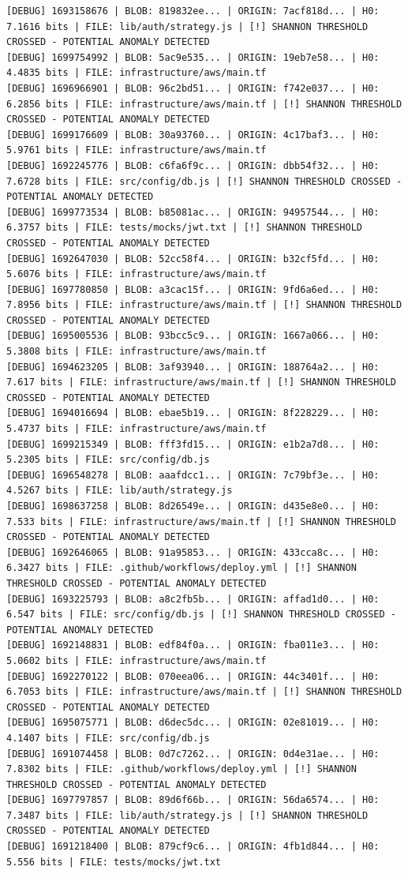 \documentclass[12pt, a4paper, oneside]{report}
\begin{document}
\begin{lstlisting}[basicstyle=\tiny\ttfamily]
[DEBUG] 1693158676 | BLOB: 819832ee... | ORIGIN: 7acf818d... | H0: 7.1616 bits | FILE: lib/auth/strategy.js | [!] SHANNON THRESHOLD CROSSED - POTENTIAL ANOMALY DETECTED
[DEBUG] 1699754992 | BLOB: 5ac9e535... | ORIGIN: 19eb7e58... | H0: 4.4835 bits | FILE: infrastructure/aws/main.tf
[DEBUG] 1696966901 | BLOB: 96c2bd51... | ORIGIN: f742e037... | H0: 6.2856 bits | FILE: infrastructure/aws/main.tf | [!] SHANNON THRESHOLD CROSSED - POTENTIAL ANOMALY DETECTED
[DEBUG] 1699176609 | BLOB: 30a93760... | ORIGIN: 4c17baf3... | H0: 5.9761 bits | FILE: infrastructure/aws/main.tf
[DEBUG] 1692245776 | BLOB: c6fa6f9c... | ORIGIN: dbb54f32... | H0: 7.6728 bits | FILE: src/config/db.js | [!] SHANNON THRESHOLD CROSSED - POTENTIAL ANOMALY DETECTED
[DEBUG] 1699773534 | BLOB: b85081ac... | ORIGIN: 94957544... | H0: 6.3757 bits | FILE: tests/mocks/jwt.txt | [!] SHANNON THRESHOLD CROSSED - POTENTIAL ANOMALY DETECTED
[DEBUG] 1692647030 | BLOB: 52cc58f4... | ORIGIN: b32cf5fd... | H0: 5.6076 bits | FILE: infrastructure/aws/main.tf
[DEBUG] 1697780850 | BLOB: a3cac15f... | ORIGIN: 9fd6a6ed... | H0: 7.8956 bits | FILE: infrastructure/aws/main.tf | [!] SHANNON THRESHOLD CROSSED - POTENTIAL ANOMALY DETECTED
[DEBUG] 1695005536 | BLOB: 93bcc5c9... | ORIGIN: 1667a066... | H0: 5.3808 bits | FILE: infrastructure/aws/main.tf
[DEBUG] 1694623205 | BLOB: 3af93940... | ORIGIN: 188764a2... | H0: 7.617 bits | FILE: infrastructure/aws/main.tf | [!] SHANNON THRESHOLD CROSSED - POTENTIAL ANOMALY DETECTED
[DEBUG] 1694016694 | BLOB: ebae5b19... | ORIGIN: 8f228229... | H0: 5.4737 bits | FILE: infrastructure/aws/main.tf
[DEBUG] 1699215349 | BLOB: fff3fd15... | ORIGIN: e1b2a7d8... | H0: 5.2305 bits | FILE: src/config/db.js
[DEBUG] 1696548278 | BLOB: aaafdcc1... | ORIGIN: 7c79bf3e... | H0: 4.5267 bits | FILE: lib/auth/strategy.js
[DEBUG] 1698637258 | BLOB: 8d26549e... | ORIGIN: d435e8e0... | H0: 7.533 bits | FILE: infrastructure/aws/main.tf | [!] SHANNON THRESHOLD CROSSED - POTENTIAL ANOMALY DETECTED
[DEBUG] 1692646065 | BLOB: 91a95853... | ORIGIN: 433cca8c... | H0: 6.3427 bits | FILE: .github/workflows/deploy.yml | [!] SHANNON THRESHOLD CROSSED - POTENTIAL ANOMALY DETECTED
[DEBUG] 1693225793 | BLOB: a8c2fb5b... | ORIGIN: affad1d0... | H0: 6.547 bits | FILE: src/config/db.js | [!] SHANNON THRESHOLD CROSSED - POTENTIAL ANOMALY DETECTED
[DEBUG] 1692148831 | BLOB: edf84f0a... | ORIGIN: fba011e3... | H0: 5.0602 bits | FILE: infrastructure/aws/main.tf
[DEBUG] 1692270122 | BLOB: 070eea06... | ORIGIN: 44c3401f... | H0: 6.7053 bits | FILE: infrastructure/aws/main.tf | [!] SHANNON THRESHOLD CROSSED - POTENTIAL ANOMALY DETECTED
[DEBUG] 1695075771 | BLOB: d6dec5dc... | ORIGIN: 02e81019... | H0: 4.1407 bits | FILE: src/config/db.js
[DEBUG] 1691074458 | BLOB: 0d7c7262... | ORIGIN: 0d4e31ae... | H0: 7.8302 bits | FILE: .github/workflows/deploy.yml | [!] SHANNON THRESHOLD CROSSED - POTENTIAL ANOMALY DETECTED
[DEBUG] 1697797857 | BLOB: 89d6f66b... | ORIGIN: 56da6574... | H0: 7.3487 bits | FILE: lib/auth/strategy.js | [!] SHANNON THRESHOLD CROSSED - POTENTIAL ANOMALY DETECTED
[DEBUG] 1691218400 | BLOB: 879cf9c6... | ORIGIN: 4fb1d844... | H0: 5.556 bits | FILE: tests/mocks/jwt.txt
\end{lstlisting}
\end{document}
